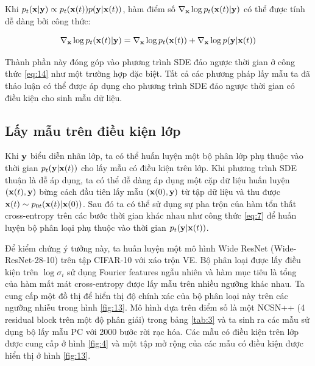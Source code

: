 \documentclass{article} %
\begin{document}
Khi $p_t (\bold{x} \vert \bold{y}) \propto p_t(\bold{x}(t)) p(\bold{y} \vert \bold{x}(t))$, hàm điểm số $\nabla_{\bold{x}} \log p_t (\bold{x}(t) \vert \bold{y})$ có thể được tính dễ dàng bởi công thức:

\begin{equation} \label{eq:49}
    \nabla_{\bold{x}} \log p_t (\bold{x}(t) \vert \bold{y}) = \nabla_{\bold{x}} \log p_t(\bold{x}(t)) + \nabla_{\bold{x}} \log p(\bold{y} \vert \bold{x}(t))
\end{equation}

Thành phần này đóng góp vào phương trình SDE đảo ngược thời gian ở công thức \ref{eq:14} như một trường hợp đặc biệt.
Tất cả các phương pháp lấy mẫu ta đã thảo luận có thể được áp dụng cho phương trình SDE đảo ngược thời gian có điều kiện cho sinh mẫu dữ liệu.

\subsection{Lấy mẫu trên điều kiện lớp} \label{I.1}

Khi $\bold{y}$ biểu diễn nhãn lớp, ta có thể huấn luyện một bộ phân lớp phụ thuộc vào thời gian $p_t(\bold{y} \vert \bold{x}(t))$ cho lấy mẫu có điều kiện trên lớp.
Khi phương trình SDE thuận là dễ áp dụng, ta có thể dễ dàng áp dụng một cặp dữ liệu huấn luyện $(\bold{x}(t), \bold{y})$ bừng cách đầu tiên lấy mẫu $(\bold{x}(0), \bold{y})$ từ tập dữ liệu và thu được $\bold{x}(t) \sim p_{0t}(\bold{x}(t) \vert \bold{x}(0))$.
Sau đó ta có thể sử dụng sự pha trộn của hàm tổn thất cross-entropy trên các bước thời gian khác nhau như công thức \ref{eq:7} để huấn luyện bộ phân loại phụ thuộc vào thời gian $p_t(\bold{y} \vert \bold{x}(t))$.

Để kiểm chứng ý tưởng này, ta huấn luyện một mô hình Wide ResNet \citep{zagoruyko2016wide} (Wide-ResNet-28-10) trên tập CIFAR-10 với xáo trộn VE.
Bộ phân loại được lấy điều kiện trên $\log \sigma_i$ sử dụng Fourier features ngẫu nhiên \citep{tancik2020fourier} và hàm mục tiêu là tổng của hàm mất mát cross-entropy được lấy mẫu trên nhiều ngưỡng khác nhau.
Ta cung cấp một đồ thị để hiển thị độ chính xác của bộ phân loại này trên các ngưỡng nhiễu trong hình \ref{fig:13}.
Mô hình dựa trên điểm số là một NCSN++ (4 residual block trên một độ phân giải) trong bảng \ref{tab:3} và ta sinh ra các mẫu sử dụng bộ lấy mẫu PC với 2000 bước rời rạc hóa.
Các mẫu có điều kiện trên lớp được cung cấp ở hình \ref{fig:4} và một tập mở rộng của các mẫu có điều kiện được hiển thị ở hình \ref{fig:13}.
\end{document}
